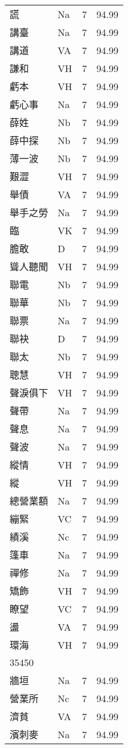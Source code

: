 \documentclass[twocolumn]{book}
\begin{document}
\begin{supertabular}{llrr}
謊 & Na & 7 &  94.99\\
講臺 & Na & 7 &  94.99\\
講道 & VA & 7 &  94.99\\
謙和 & VH & 7 &  94.99\\
虧本 & VH & 7 &  94.99\\
虧心事 & Na & 7 &  94.99\\
薛姓 & Nb & 7 &  94.99\\
薛中探 & Nb & 7 &  94.99\\
薄一波 & Nb & 7 &  94.99\\
艱澀 & VH & 7 &  94.99\\
舉債 & VA & 7 &  94.99\\
舉手之勞 & Na & 7 &  94.99\\
臨 & VK & 7 &  94.99\\
膽敢 & D & 7 &  94.99\\
聳人聽聞 & VH & 7 &  94.99\\
聯電 & Nb & 7 &  94.99\\
聯華 & Nb & 7 &  94.99\\
聯票 & Na & 7 &  94.99\\
聯袂 & D & 7 &  94.99\\
聯太 & Nb & 7 &  94.99\\
聰慧 & VH & 7 &  94.99\\
聲淚俱下 & VH & 7 &  94.99\\
聲帶 & Na & 7 &  94.99\\
聲息 & Na & 7 &  94.99\\
聲波 & Na & 7 &  94.99\\
縱情 & VH & 7 &  94.99\\
縱 & VH & 7 &  94.99\\
總營業額 & Na & 7 &  94.99\\
繃緊 & VC & 7 &  94.99\\
績溪 & Nc & 7 &  94.99\\
篷車 & Na & 7 &  94.99\\
禪修 & Na & 7 &  94.99\\
矯飾 & VH & 7 &  94.99\\
瞭望 & VC & 7 &  94.99\\
盪 & VA & 7 &  94.99\\
環海 & VH & 7 &  94.99\\
35450\\
牆垣 & Na & 7 &  94.99\\
營業所 & Nc & 7 &  94.99\\
濟貧 & VA & 7 &  94.99\\
濱刺麥 & Na & 7 &  94.99\\

\end{supertabular}
\end{document}
